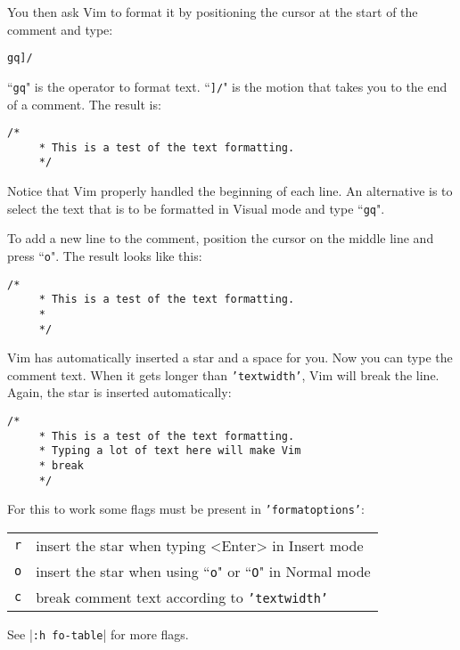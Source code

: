 You then ask Vim to format it by positioning the cursor at the start of the comment and type:

\begin{Verbatim}[samepage=true]
 gq]/
\end{Verbatim}

``\texttt{gq}" is the operator to format text.
``\texttt{]/}" is the motion that takes you to the end of a comment.
The result is:

\begin{Verbatim}[samepage=true]
    /* 
     * This is a test of the text formatting. 
     */ 
\end{Verbatim}

Notice that Vim properly handled the beginning of each line.
An alternative is to select the text that is to be formatted in Visual mode and type ``\texttt{gq}".

To add a new line to the comment, position the cursor on the middle line and press ``\texttt{o}".
The result looks like this:

\begin{Verbatim}[samepage=true]
    /* 
     * This is a test of the text formatting. 
     * 
     */ 
\end{Verbatim}

Vim has automatically inserted a star and a space for you.
Now you can type the comment text.
When it gets longer than \texttt{'textwidth'}, Vim will break the line.
Again, the star is inserted automatically:

\begin{Verbatim}[samepage=true]
    /* 
     * This is a test of the text formatting. 
     * Typing a lot of text here will make Vim 
     * break 
     */ 
\end{Verbatim}

For this to work some flags must be present in \texttt{'formatoptions'}:

\begin{center} \begin{tabular}{c l}
\texttt{r} & insert the star when typing <Enter> in Insert mode \\
\texttt{o} & insert the star when using ``\texttt{o}" or ``\texttt{O}" in Normal mode \\
\texttt{c} & break comment text according to \texttt{'textwidth'} \\
\end{tabular} \end{center}

See |\texttt{:h fo-table}| for more flags.

